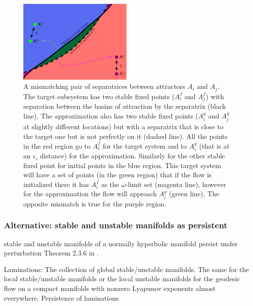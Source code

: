\documentclass{article}
\theoremstyle{definition}
\theoremstyle{remark}
\newcounter{ct}
\begin{document}
\setlength\belowcaptionskip{-5ex}
\begin{figure}
  \centering
  \includegraphics[width=0.5\textwidth]{separatrices}
  \caption{
	A mismatching pair of separatrices between attractors $A_i$ and $A_j$.
	The target subsystem has two stable fixed points ($A_i^f$ and $A_j^f$) with separation between the basins of attraction by the separatrix (black line).
	The approximation also has two stable fixed points ($A_i^g$ and $A_j^g$ at slightly different locations) but with a separatrix that is close to the target one but is not perfectly on it (dashed line).
	All the points in the red region go to $A_i^f$ for the target system and to $A_i^g$ (that is at an $\epsilon_i$ distance) for the approximation. Similarly for the other stable fixed point for initial points in the blue region.
	This target system will have a set of points (in the green region) that if the flow is initialized there it has $A_i^f$ as the $\omega$-limit set (magenta line), however for the approximation the flow will approach $A_i^g$ (green line).
	The opposite mismatch is true for the purple region.
  }\label{fig:separatrices}
\end{figure}



\subsubsection{Alternative: stable and unstable manifolds as persistent}
stable and unstable manifolds of a normally hyperbolic manifold persist under perturbation Theorem 2.3.6 in \citep{kuehn2015multipletimescale}.

Laminations: The collection of global stable/unstable manifolds. The same for the local stable/unstable manifolds or the local unstable manifolds for the geodesic flow on a compact manifolds with nonzero Lyapunov exponents almost everywhere. 
Persistence of laminations \citep{berger2010persistence}
\end{document}
